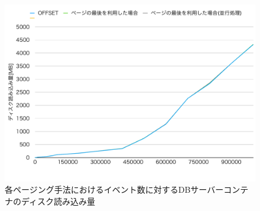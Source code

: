 \documentclass[../../../../../main]{subfiles}
\begin{document}
    \begin{figure}[H]
        \centering
        \includegraphics[width=12cm]{graph}
        \caption{各ページング手法におけるイベント数に対するDBサーバーコンテナのディスク読み込み量}
        \label{fig:each-paging-db-disk-out-app_1_1024-db_1_1024}
    \end{figure}
\end{document}
